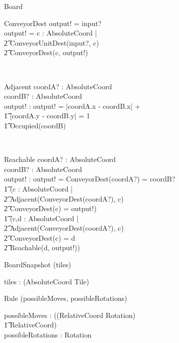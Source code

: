 \documentclass[12pt]{article}
\begin{document}
\begin{class}{Board}
\begin{schema}{ConveyorDest}
\THEN output! = input? \\
\ELSE output! = \exists c : AbsoluteCoord | \\ \t2 ConveyorUnitDest(input?, c) \\ \t2 ConveyorDest(c, output!)
\end{schema} \\
\begin{schema}{Adjacent}
coordA? : AbsoluteCoord \\
coordB? : AbsoluteCoord \\
output! : \bool
\where
output! = |\!coordA.x - coordB.x\!| + \\ \t1 |\!coordA.y - coordB.y\!| = 1 \\ \t1
\neg Occupied(coordB)
\end{schema} \\
\begin{schema}{Reachable}
coordA? : AbsoluteCoord \\
coordB? : AbsoluteCoord \\
output! : \bool
\where
output! = ConveyorDest(coordA?) = coordB? \: \vee \\ \t1 (\exists c : AbsoluteCoord | \\ \t2 Adjacent(ConveyorDest(coordA?), c) \: \wedge \\ \t2 ConveyorDest(c) = output!) \: \vee \\ \t1
(\exists c,d : AbsoluteCoord | \\ \t2 Adjacent(ConveyorDest(coordA?), c) \: \wedge \\ \t2 ConveyorDest(c) = d \: \wedge \\ \t2 Reachable(d, output!))
\end{schema}
\end{class}

\begin{class}{BoardSnapshot}
\upharpoonright (tiles) \\
\begin{state}
tiles : \power (AbsoluteCoord \fun Tile) \\
\end{state}
\end{class}

\begin{class}{Rule}
\upharpoonright (possibleMoves, possibleRotations) \\
\begin{state}
possibleMoves : \power ((RelativeCoord \times Rotation) \psurj \\ \t1 \seq RelativeCoord) \\
possibleRotations : \power Rotation
\end{state}
\end{class}
\end{document}
